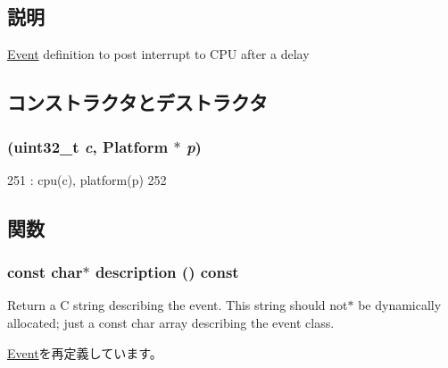 \subsection{説明}
\hyperlink{classEvent}{Event} definition to post interrupt to CPU after a delay 

\subsection{コンストラクタとデストラクタ}
\hypertarget{classPl390_1_1PostIntEvent_a1d50f56c27c573352972378ca859ef13}{
\subsubsection[{PostIntEvent}]{ ({\bf uint32\_\-t} {\em c}, \/  {\bf Platform} $\ast$ {\em p})}}
\label{classPl390_1_1PostIntEvent_a1d50f56c27c573352972378ca859ef13}



\begin{DoxyCode}
251             : cpu(c), platform(p)
252         { }
\end{DoxyCode}


\subsection{関数}
\hypertarget{classPl390_1_1PostIntEvent_a2bd90422eece9190794479e08092a252}{
\subsubsection[{description}]{\setlength{\rightskip}{0pt plus 5cm}const char$\ast$ description () const}}
\label{classPl390_1_1PostIntEvent_a2bd90422eece9190794479e08092a252}
Return a C string describing the event. This string should not$\ast$ be dynamically allocated; just a const char array describing the event class. 

\hyperlink{classEvent_a130ddddf003422b413e2e891b1b80e8f}{Event}を再定義しています。


